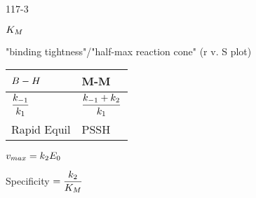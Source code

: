\begin{mitframe}{117-3}
    
\begin{listone}
	\item $\dilfac_M$
    \begin{listtwo}
		\item "binding tightness"/"half-max reaction cone" (r v. S plot)
	\end{listtwo}

	\begin{center}
	\begin{tabular}
	{| >{\centering\arraybackslash}m{2cm} | >{\centering\arraybackslash}m{2cm} |}
\hline 
 
	$\exergy-\enthalpy$&%
	M-M\\ \hline

	$\dfrac{\thermcond_{-1}}{\thermcond_1}$ &%
	$\dfrac{\thermcond_{-1}+\thermcond_2}{\thermcond_1}$ \\ \hline

	Rapid Equil &%
	PSSH\\ \hline

	\end{tabular}
	\end{center}
 
	\begin{listtwo}
	    \item $\vvel_{max}=\thermcond_2\energy_{\init}$
   		
        \item Specificity $=\dfrac{\thermcond_2}{\dilfac_M}$
    \end{listtwo}
    
\end{listone}
\end{mitframe}